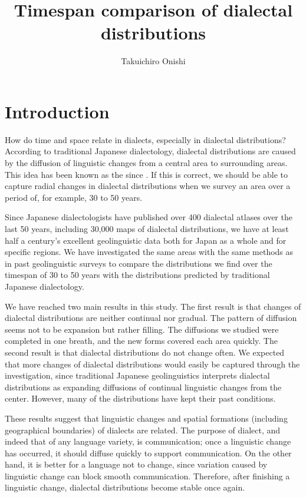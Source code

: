 \documentclass[output=paper]{LSP/langsci}
\author{Takuichiro Onishi\affiliation{National Institute for Japanese Language and Linguistics}}
\title{Timespan comparison of dialectal distributions}
\begin{document}
 
 
% 
% 
 
\section{Introduction}

How do time and space relate in dialects, especially in dialectal distributions? According to traditional Japanese dialectology, dialectal distributions are caused by the diffusion of linguistic changes from a central area to surrounding areas. This idea has been known as the  since \citet{yanagita_kagyuukoo._1930}. If this is correct, we should be able to capture radial changes in dialectal distributions when we survey an area over a period of, for example, 30 to 50 years.

Since Japanese dialectologists have published over 400 dialectal atlases over the last 50 years, including 30,000 maps of dialectal distributions, we have at least half a century’s excellent geolinguistic data both for Japan as a whole and for specific regions. We have investigated the same areas with the same methods as in past geolinguistic surveys to compare the distributions we find over the timespan of 30 to 50 years with the distributions predicted by traditional Japanese dialectology.

We have reached two main results in this study. The first result is that changes of dialectal distributions are neither continual nor gradual. The pattern of diffusion seems not to be expansion but rather filling. The diffusions we studied were completed in one breath, and the new forms covered each area quickly. The second result is that dialectal distributions do not change often. We expected that more changes of dialectal distributions would easily be captured through the investigation, since traditional Japanese geolinguistics interprets dialectal distributions as expanding diffusions of continual linguistic changes from the center. However, many of the distributions have kept their past conditions.

These results suggest that linguistic changes and spatial formations (including geographical boundaries) of dialects are related. The purpose of dialect, and indeed that of any language variety, is communication; once a linguistic change has occurred, it should diffuse quickly to support communication. On the other hand, it is better for a language not to change, since variation caused by linguistic change can block smooth communication. Therefore, after finishing a linguistic change, dialectal distributions become stable once again.
\end{document}
